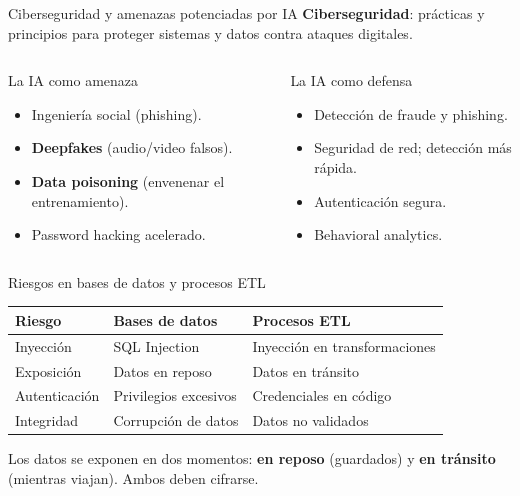\documentclass[aspectratio=169]{beamer}
\begin{document}
\begin{frame}{Ciberseguridad y amenazas potenciadas por IA}
  \textbf{Ciberseguridad}: pr\'acticas y principios para proteger sistemas y
  datos contra ataques digitales.
  \begin{columns}[t]
      \begin{block}{La IA como amenaza}
        \begin{itemize}
          \item Ingenier\'ia social (phishing).
          \item \textbf{Deepfakes} (audio/video falsos).
          \item \textbf{Data poisoning} (envenenar el entrenamiento).
          \item Password hacking acelerado.
        \end{itemize}
      \end{block}
      \begin{block}{La IA como defensa}
        \begin{itemize}
          \item Detecci\'on de fraude y phishing.
          \item Seguridad de red; detecci\'on m\'as r\'apida.
          \item Autenticaci\'on segura.
          \item Behavioral analytics.
        \end{itemize}
      \end{block}
  \end{columns}
\end{frame}

\begin{frame}{Riesgos en bases de datos y procesos ETL}
  \small
  \begin{center}
  \begin{tabular}{p{2.3cm} p{4.2cm} p{4.2cm}}
    \textbf{Riesgo} & \textbf{Bases de datos} & \textbf{Procesos ETL}\\[2pt]
    \hline
    Inyecci\'on & SQL Injection & Inyecci\'on en transformaciones\\[2pt]
    Exposici\'on & Datos en reposo & Datos en tr\'ansito\\[2pt]
    Autenticaci\'on & Privilegios excesivos & Credenciales en c\'odigo\\[2pt]
    Integridad & Corrupci\'on de datos & Datos no validados\\
    \hline
  \end{tabular}
  \end{center}
  \vspace{0.3em}
  Los datos se exponen en dos momentos: \textbf{en reposo} (guardados) y
  \textbf{en tr\'ansito} (mientras viajan). Ambos deben cifrarse.
\end{frame}
\end{document}
